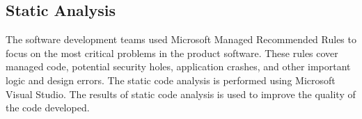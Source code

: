 \subsection{Static Analysis}
The software development teams used Microsoft Managed Recommended Rules to focus
on the most critical problems in the product software. These rules cover managed
code, potential security holes, application crashes, and other important logic
and design errors. The static code analysis is performed using Microsoft Visual
Studio. The results of static code analysis is  used to improve the quality
of the code developed.

